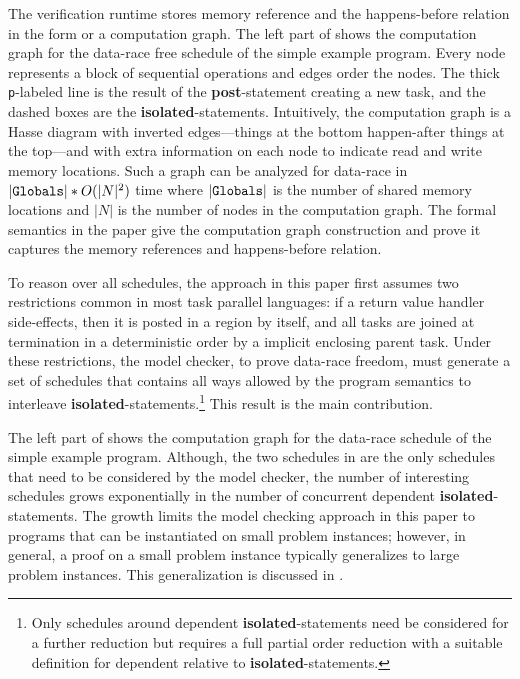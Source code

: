 The verification runtime stores memory reference and the happens-before relation in the form or a computation graph.
The left part of  shows the computation graph for the data-race free schedule of the simple example program.
Every node represents a block of sequential operations and edges order the nodes.
The thick \texttt{p}-labeled line is the result of the \textbf{post}-statement creating a new task, and the dashed boxes are the \textbf{isolated}-statements. 
Intuitively, the computation graph is a Hasse diagram with inverted edges---things at the bottom happen-after things at the top---and with extra information on each node to indicate read and write memory locations.
Such a graph can be analyzed for data-race in $|\mathtt{Globals}| * O(|N|^2)$ time where $|\mathtt{Globals}|$ is the number of shared memory locations and $|N|$ is the number of nodes in the computation graph. The formal semantics in the paper give the computation graph construction and prove it captures the memory references and happens-before relation.

To reason over all schedules, the approach in this paper first assumes two restrictions common in most task parallel languages: if a return value handler side-effects, then it is posted in a region by itself, and all tasks are joined at termination in a deterministic order by a implicit enclosing parent task.
Under these restrictions, the model checker, to prove data-race freedom, must generate a set of schedules that contains all ways allowed by the program semantics to interleave \textbf{isolated}-statements.\footnote{Only schedules around dependent \textbf{isolated}-statements need be considered for a further reduction but requires a full partial order reduction with a suitable definition for dependent relative to \textbf{isolated}-statements.}
This result is the main contribution.

The left part of  shows the  computation graph for  the data-race schedule of the simple example program. 
Although, the two schedules in  are the only schedules that need to be considered by the model checker, the number of interesting schedules grows exponentially in the number of concurrent dependent \textbf{isolated}-statements.
The growth limits the model checking approach in this paper to programs that can be instantiated on small problem instances;
however, in general, a proof on a small problem instance typically generalizes to large problem instances. This generalization is discussed in .

